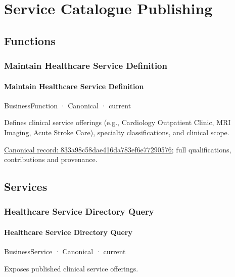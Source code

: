 \section{Service Catalogue Publishing}

\subsection{Functions}

\subsubsection{Maintain Healthcare Service Definition}

\paragraph{Maintain Healthcare Service Definition}

\label{element:833a98c58dae416da783ef6e77290576}
{\small BusinessFunction · Canonical · current}\par

Defines clinical service offerings (e.g., Cardiology Outpatient Clinic, MRI Imaging, Acute Stroke Care), specialty classifications, and clinical scope.


{\footnotesize \href{../../../../continuum/business/business-function/833a98c58dae416da783ef6e77290576.md}{Canonical record: 833a98c58dae416da783ef6e77290576}; full qualifications, contributions and provenance.}\par
\subsection{Services}

\subsubsection{Healthcare Service Directory Query}

\paragraph{Healthcare Service Directory Query}

\label{element:c7bf105e1217441a9423706b1481d153}
{\small BusinessService · Canonical · current}\par

Exposes published clinical service offerings.


